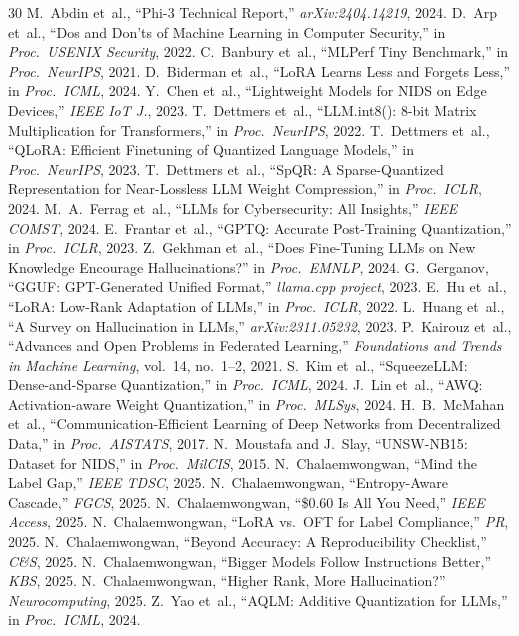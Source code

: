 \documentclass[journal]{IEEEtran}
\begin{document}
\begin{thebibliography}{30}
 M.~Abdin et~al., ``Phi-3 Technical Report,'' \emph{arXiv:2404.14219}, 2024.
 D.~Arp et~al., ``Dos and Don'ts of Machine Learning in Computer Security,'' in \emph{Proc.\ USENIX Security}, 2022.
 C.~Banbury et~al., ``MLPerf Tiny Benchmark,'' in \emph{Proc.\ NeurIPS}, 2021.
 D.~Biderman et~al., ``LoRA Learns Less and Forgets Less,'' in \emph{Proc.\ ICML}, 2024.
 Y.~Chen et~al., ``Lightweight Models for NIDS on Edge Devices,'' \emph{IEEE IoT J.}, 2023.
 T.~Dettmers et~al., ``LLM.int8(): 8-bit Matrix Multiplication for Transformers,'' in \emph{Proc.\ NeurIPS}, 2022.
 T.~Dettmers et~al., ``QLoRA: Efficient Finetuning of Quantized Language Models,'' in \emph{Proc.\ NeurIPS}, 2023.
 T.~Dettmers et~al., ``SpQR: A Sparse-Quantized Representation for Near-Lossless LLM Weight Compression,'' in \emph{Proc.\ ICLR}, 2024.
 M.~A.~Ferrag et~al., ``LLMs for Cybersecurity: All Insights,'' \emph{IEEE COMST}, 2024.
 E.~Frantar et~al., ``GPTQ: Accurate Post-Training Quantization,'' in \emph{Proc.\ ICLR}, 2023.
 Z.~Gekhman et~al., ``Does Fine-Tuning LLMs on New Knowledge Encourage Hallucinations?'' in \emph{Proc.\ EMNLP}, 2024.
 G.~Gerganov, ``GGUF: GPT-Generated Unified Format,'' \emph{llama.cpp project}, 2023.
 E.~Hu et~al., ``LoRA: Low-Rank Adaptation of LLMs,'' in \emph{Proc.\ ICLR}, 2022.
 L.~Huang et~al., ``A Survey on Hallucination in LLMs,'' \emph{arXiv:2311.05232}, 2023.
 P.~Kairouz et~al., ``Advances and Open Problems in Federated Learning,'' \emph{Foundations and Trends in Machine Learning}, vol.~14, no.~1--2, 2021.
 S.~Kim et~al., ``SqueezeLLM: Dense-and-Sparse Quantization,'' in \emph{Proc.\ ICML}, 2024.
 J.~Lin et~al., ``AWQ: Activation-aware Weight Quantization,'' in \emph{Proc.\ MLSys}, 2024.
 H.~B.~McMahan et~al., ``Communication-Efficient Learning of Deep Networks from Decentralized Data,'' in \emph{Proc.\ AISTATS}, 2017.
 N.~Moustafa and J.~Slay, ``UNSW-NB15: Dataset for NIDS,'' in \emph{Proc.\ MilCIS}, 2015.
 N.~Chalaemwongwan, ``Mind the Label Gap,'' \emph{IEEE TDSC}, 2025.
 N.~Chalaemwongwan, ``Entropy-Aware Cascade,'' \emph{FGCS}, 2025.
 N.~Chalaemwongwan, ``\$0.60 Is All You Need,'' \emph{IEEE Access}, 2025.
 N.~Chalaemwongwan, ``LoRA vs.\ OFT for Label Compliance,'' \emph{PR}, 2025.
 N.~Chalaemwongwan, ``Beyond Accuracy: A Reproducibility Checklist,'' \emph{C\&S}, 2025.
 N.~Chalaemwongwan, ``Bigger Models Follow Instructions Better,'' \emph{KBS}, 2025.
 N.~Chalaemwongwan, ``Higher Rank, More Hallucination?'' \emph{Neurocomputing}, 2025.
 Z.~Yao et~al., ``AQLM: Additive Quantization for LLMs,'' in \emph{Proc.\ ICML}, 2024.
\end{thebibliography}
\end{document}
